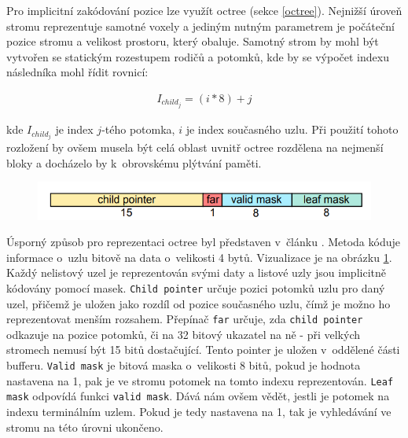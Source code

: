 Pro implicitní zakódování pozice lze využít octree (sekce \ref{octree}). Nejnižší úroveň stromu reprezentuje samotné voxely a jediným nutným parametrem je počáteční pozice stromu a velikost prostoru, který obaluje. Samotný strom by mohl být vytvořen se statickým rozestupem rodičů a potomků, kde by se výpočet indexu následníka mohl řídit rovnicí:

\begin{equation} \label{eq:simple_octree_index}
	\begin{gathered}
		I_{child_j} = (i * 8) + j
	\end{gathered}
\end{equation}

kde $I_{child_j}$ je index $j$-tého potomka, $i$ je index současného uzlu. Při použití tohoto rozložení by ovšem musela být celá oblast uvnitř octree rozdělena na nejmenší bloky a docházelo by k~obrovskému plýtvání paměti.

\begin{figure}[H]
	\centering
	\includegraphics[scale=1.7]{obrazky-figures/octree_child_data.png}
	\captionsetup{justification=centering}
	\label{fig:octree_child}
\end{figure}

Úsporný způsob pro reprezentaci octree byl představen v~článku \cite{Laine2011EfficientSV}. Metoda kóduje informace o~uzlu bitově na data o~velikosti 4 bytů. Vizualizace je na obrázku \ref{fig:octree_child}. Každý nelistový uzel je reprezentován svými daty a listové uzly jsou implicitně kódovány pomocí masek. \texttt{Child pointer} určuje pozici potomků uzlu pro daný uzel, přičemž je uložen jako rozdíl od pozice současného uzlu, čímž je možno ho reprezentovat menším rozsahem. Přepínač \texttt{far} určuje, zda \texttt{child pointer} odkazuje na pozice potomků, či na 32 bitový ukazatel na ně - při velkých stromech nemusí být 15 bitů dostačující. Tento pointer je uložen v~oddělené části bufferu. \texttt{Valid mask} je bitová maska o~velikosti 8 bitů, pokud je hodnota nastavena na 1, pak je ve stromu potomek na tomto indexu reprezentován. \texttt{Leaf mask} odpovídá funkci \texttt{valid mask}. Dává nám ovšem vědět, jestli je potomek na indexu terminálním uzlem. Pokud je tedy nastavena na 1, tak je vyhledávání ve stromu na této úrovni ukončeno.

